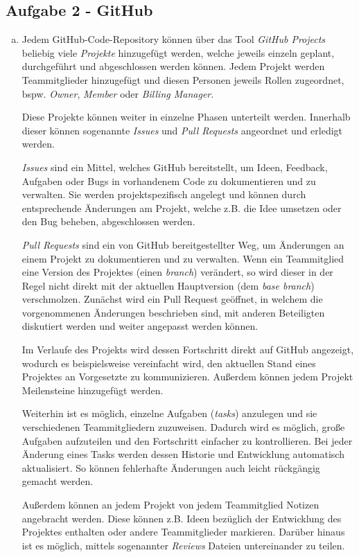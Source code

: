 \subsection{Aufgabe 2 - GitHub}
\begin{enumerate}[(a)]
	\item Jedem GitHub-Code-Repository können über das Tool \emph{GitHub Projects} beliebig viele \emph{Projekte} hinzugefügt werden, welche jeweils einzeln geplant, durchgeführt und abgeschlossen werden können. Jedem Projekt werden Teammitglieder hinzugefügt und diesen Personen jeweils Rollen zugeordnet, bspw. \emph{Owner}, \emph{Member} oder \emph{Billing Manager}.
	
	Diese Projekte können weiter in einzelne Phasen unterteilt werden. Innerhalb dieser können sogenannte \emph{Issues} und \emph{Pull Requests} angeordnet und erledigt werden.
	
	\emph{Issues} sind ein Mittel, welches GitHub bereitstellt, um Ideen, Feedback, Aufgaben oder Bugs in vorhandenem Code zu dokumentieren und zu verwalten. Sie werden projektspezifisch angelegt und können durch entsprechende Änderungen am Projekt, welche z.B. die Idee umsetzen oder den Bug beheben, abgeschlossen werden.
	
	\emph{Pull Requests} sind ein von GitHub bereitgestellter Weg, um Änderungen an einem Projekt zu dokumentieren und zu verwalten. Wenn ein Teammitglied eine Version des Projektes (einen \emph{branch}) verändert, so wird dieser in der Regel nicht direkt mit der aktuellen Hauptversion (dem \emph{base branch}) verschmolzen. Zunächst wird ein Pull Request geöffnet, in welchem die vorgenommenen Änderungen beschrieben sind, mit anderen Beteiligten diskutiert werden und weiter angepasst werden können.
	
	Im Verlaufe des Projekts wird dessen Fortschritt direkt auf GitHub angezeigt, wodurch es beispielsweise vereinfacht wird, den aktuellen Stand eines Projektes an Vorgesetzte zu kommunizieren. Außerdem können jedem Projekt Meilensteine hinzugefügt werden.
	
	Weiterhin ist es möglich, einzelne Aufgaben (\emph{tasks}) anzulegen und sie verschiedenen Teammitgliedern zuzuweisen. Dadurch wird es möglich, große Aufgaben aufzuteilen und den Fortschritt einfacher zu kontrollieren. Bei jeder Änderung eines Tasks werden dessen Historie und Entwicklung automatisch aktualisiert. So können fehlerhafte Änderungen auch leicht rückgängig gemacht werden.
	
	Außerdem können an jedem Projekt von jedem Teammitglied Notizen angebracht werden. Diese können z.B. Ideen bezüglich der Entwicklung des Projektes enthalten oder andere Teammitglieder markieren. Darüber hinaus ist es möglich, mittels sogenannter \emph{Reviews} Dateien untereinander zu teilen.
	

\end{enumerate}
